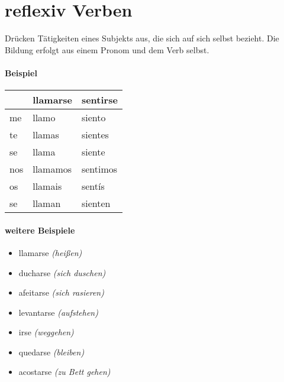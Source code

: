 \documentclass{../spanish_summary}
\begin{document}
\chapter*{reflexiv Verben}
Drücken Tätigkeiten eines Subjekts aus, die sich auf sich selbst bezieht. Die Bildung erfolgt aus einem Pronom und dem Verb selbst.

\subsubsection*{Beispiel}
\begin{longtable}{p{} | p{} | p{} } 
\textbf{~}     & \textbf{llamarse} & \textbf{sentirse} \\ \hline
\hline
\endhead %
me & llamo & siento \\
te & llamas & sientes \\
se & llama & siente\\
nos & llamamos & sentimos\\
os & llamais & sentís\\
se & llaman & sienten\\
\end{longtable}

\subsubsection*{weitere Beispiele}
\begin{itemize}
  \item llamarse \textit{(heißen)}
  \item ducharse \textit{(sich duschen)}
  \item afeitarse \textit{(sich rasieren)}
  \item levantarse \textit{(aufstehen)}
  \item irse \textit{(weggehen)}
  \item quedarse \textit{(bleiben)}
  \item acostarse \textit{(zu Bett gehen)}
\end{itemize}
\end{document}
